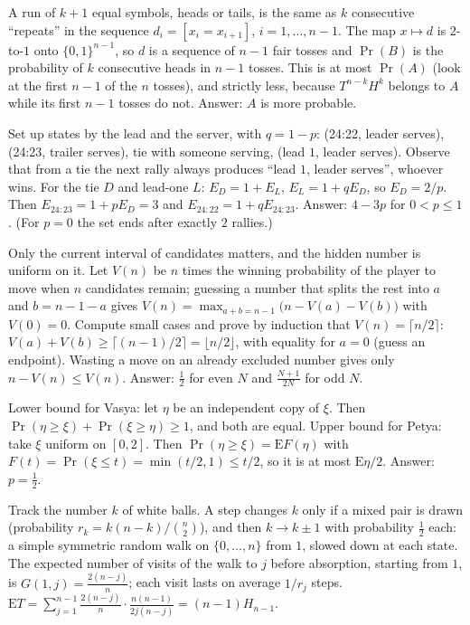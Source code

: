 \documentclass[11pt,a4paper]{article}
\begin{document}

 A run of $k+1$ equal symbols, heads or tails, is the same as $k$ consecutive ``repeats'' in the sequence $d_i=[x_i=x_{i+1}]$, $i=1,\dots,n-1$.
 The map $x\mapsto d$ is $2$-to-$1$ onto $\{0,1\}^{n-1}$, so $d$ is a sequence of $n-1$ fair tosses and $\Pr(B)$ is the probability of $k$ consecutive heads in $n-1$ tosses.
 This is at most $\Pr(A)$ (look at the first $n-1$ of the $n$ tosses), and strictly less, because $T^{n-k}H^k$ belongs to $A$ while its first $n-1$ tosses do not. Answer: $A$ is more probable.

 Set up states by the lead and the server, with $q=1-p$: (24:22, leader serves), (24:23, trailer serves), tie with someone serving, (lead $1$, leader serves). Observe that from a tie the next rally always produces ``lead $1$, leader serves'', whoever wins.
 For the tie $D$ and lead-one $L$: $E_D=1+E_L$, $E_L=1+qE_D$, so $E_D=2/p$. Then $E_{24:23}=1+pE_D=3$ and $E_{24:22}=1+qE_{24:23}$.
 Answer: $4-3p$ for $0<p\le1$. (For $p=0$ the set ends after exactly $2$ rallies.)

 Only the current interval of candidates matters, and the hidden number is uniform on it. Let $V(n)$ be $n$ times the winning probability of the player to move when $n$ candidates remain; guessing a number that splits the rest into $a$ and $b=n-1-a$ gives $V(n)=\max_{a+b=n-1}\bigl(n-V(a)-V(b)\bigr)$ with $V(0)=0$.
 Compute small cases and prove by induction that $V(n)=\lceil n/2\rceil$: $V(a)+V(b)\ge\lceil(n-1)/2\rceil=\lfloor n/2\rfloor$, with equality for $a=0$ (guess an endpoint). Wasting a move on an already excluded number gives only $n-V(n)\le V(n)$.
 Answer: $\frac12$ for even $N$ and $\frac{N+1}{2N}$ for odd $N$.

 Lower bound for Vasya: let $\eta$ be an independent copy of $\xi$. Then $\Pr(\eta\ge\xi)+\Pr(\xi\ge\eta)\ge1$, and both are equal.
 Upper bound for Petya: take $\xi$ uniform on $[0,2]$. Then $\Pr(\eta\ge\xi)=\mathrm{E}F(\eta)$ with $F(t)=\Pr(\xi\le t)=\min(t/2,1)\le t/2$, so it is at most $\mathrm{E}\eta/2$. Answer: $p=\frac12$.

 Track the number $k$ of white balls. A step changes $k$ only if a mixed pair is drawn (probability $r_k=k(n-k)/\binom n2$), and then $k\to k\pm1$ with probability $\frac12$ each: a simple symmetric random walk on $\{0,\dots,n\}$ from $1$, slowed down at each state.
 The expected number of visits of the walk to $j$ before absorption, starting from $1$, is $G(1,j)=\frac{2(n-j)}n$; each visit lasts on average $1/r_j$ steps.
 $\mathrm{E}T=\sum_{j=1}^{n-1}\frac{2(n-j)}n\cdot\frac{n(n-1)}{2j(n-j)}=(n-1)H_{n-1}$.
\end{document}
